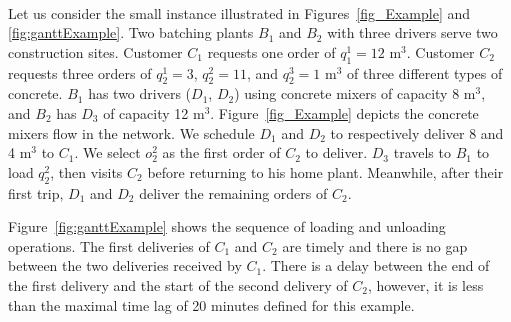 \documentclass{article}
\begin{document}
{\paragraph*{}
Let us consider the small instance illustrated in Figures~\ref{fig_Example} and \ref{fig:ganttExample}. Two batching plants $B_1$ and $B_2$ with three drivers serve two construction sites. Customer $C_1$ requests one order of $q^1_1=12$ m$^3$. Customer $C_2$ requests three orders of $q^1_2=3$, $q^2_2=11$, and $q^3_2=1$ m$^3$ of three different types of concrete. $B_1$ has two drivers ($D_1$, $D_2$) using concrete mixers of capacity 8 m$^3$, and $B_2$ has $D_3$ of capacity 12 m$^3$. Figure~\ref{fig_Example} depicts the concrete mixers flow in the network. We schedule $D_1$ and $D_2$ to respectively deliver 8 and 4 m$^3$ to $C_1$. We select $o^2_2$ as the first order of $C_2$ to deliver. $D_3$ travels to $B_1$ to load $q^2_2$, then visits $C_2$ before returning to his home plant. Meanwhile, after their first trip,  $D_1$ and $D_2$ deliver the remaining orders of $C_2$.

Figure~\ref{fig:ganttExample} shows the sequence of loading and unloading operations. The first deliveries of $C_1$ and $C_2$ are timely and there is no gap between the two deliveries received by $C_1$. There is a delay between the end of the first delivery and the start of the second delivery of $C_2$, however, it is less than the maximal time lag of 20 minutes defined for this example.


\begin{figure}[!ht]
    \vspace*{-10mm}

    \centering
    \begin{adjustbox}{max width=0.85\textwidth}
      
\end{adjustbox}
\end{figure}}
\end{document}
